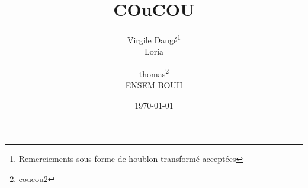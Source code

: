 \documentclass[a4paper,12pt]{article}
\begin{document}
\title{COuCOU}
\author{Virgile Daugé\thanks{Remerciements sous forme de houblon transformé acceptées}\\Loria \and thomas\thanks{coucou2}\\ENSEM BOUH}%
\date{\today}
\end{document}
